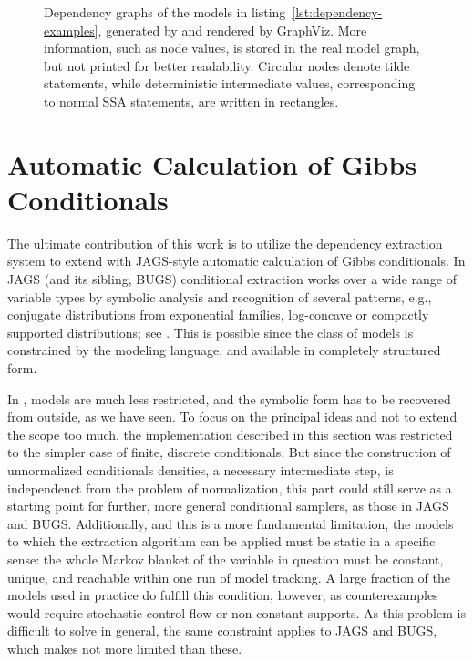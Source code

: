 \begin{figure}[p]
  \caption{Dependency graphs of the models in listing~\ref{lst:dependency-examples}, generated by
    \autogibbsjl{} and rendered by GraphViz.  More information, such as node values, is stored in
    the real model graph, but not printed for better readability.  Circular nodes denote tilde
    statements, while deterministic intermediate values, corresponding to normal SSA statements, are
    written in rectangles.}
  \label{fig:geom-deps}
\end{figure}


\section{Automatic Calculation of Gibbs Conditionals}
\label{sec:automatic-conditionals}

The ultimate contribution of this work is to utilize the dependency extraction system to extend
\turingjl{} with JAGS-style automatic calculation of Gibbs conditionals.  In JAGS (and its sibling,
BUGS) conditional extraction works over a wide range of variable types \parencite{plummer2003jags}
by symbolic analysis and recognition of several patterns, e.g., conjugate distributions from
exponential families, log-concave or compactly supported distributions; see
\textcite{lunn2000winbugs}.  This is possible since the class of models is constrained by the
modeling language, and available in completely structured form.

In \turingjl{}, models are much less restricted, and the symbolic form has to be recovered from
outside, as we have seen.  To focus on the principal ideas and not to extend the scope too much, the
implementation described in this section was restricted to the simpler case of finite, discrete
conditionals.  But since the construction of unnormalized conditionals densities, a necessary
intermediate step, is independenct from the problem of normalization, this part could still serve as
a starting point for further, more general conditional samplers, as those in JAGS and BUGS.
Additionally, and this is a more fundamental limitation, the models to which the extraction
algorithm can be applied must be static in a specific sense: the whole Markov blanket of the
variable in question must be constant, unique, and reachable within one run of model tracking.  A
large fraction of the models used in practice do fulfill this condition, however, as counterexamples
would require stochastic control flow or non-constant supports.  As this problem is difficult to
solve in general, the same constraint applies to JAGS and BUGS, which makes \autogibbsjl{} not more
limited than these.

